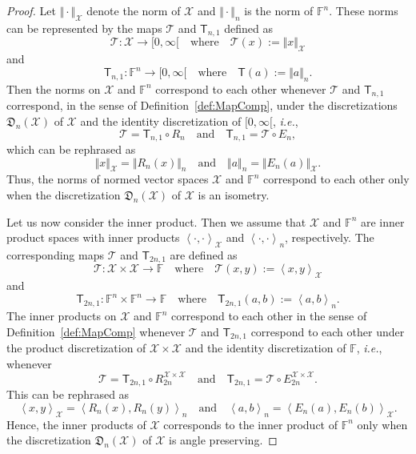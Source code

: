 \documentclass[a4paper]{paper}
\newcommand{\discr}{\mathfrak{D}}
\newcommand{\VecSpace}[1]{\mathscr{#1}}
\newcommand{\Field}{\mathbb{F}}
\newcommand{\Op}[1]{\mathcal{#1}}
\newcommand{\DiscOp}[1]{\mathsf{#1}}
\newcommand{\ip}[2]{\left \langle #1,#2 \right\rangle}
\newcommand{\ie}{\textsl{i.e.}\xspace}
\begin{document}
\begin{proof}
Let $\Vert \cdot \Vert_{\VecSpace{X}}$ denote the norm of $\VecSpace{X}$ and $\Vert \cdot \Vert_{n}$ is the 
norm of $\Field^{n}$. These norms can be represented by the maps $\Op{T}$ and $\DiscOp{T}_{n,1}$ 
defined as  
\[ \Op{T} \colon \VecSpace{X}  \to [0,\infty[  \quad\text{where}\quad \Op{T}(x):=\Vert x \Vert_{\VecSpace{X}} \] 
and 
\[ \DiscOp{T}_{n,1} \colon \Field^{n} \to [0,\infty[  \quad\text{where}\quad \DiscOp{T}(a):=\Vert a \Vert_{n}. \] 
Then the norms on $\VecSpace{X}$ and $\Field^{n}$ 
correspond to each other whenever $\Op{T}$ and $\DiscOp{T}_{n,1}$ correspond,
in the sense of Definition~\ref{def:MapComp},  under the discretizations $\discr_{n}(\VecSpace{X})$ of $\VecSpace{X}$ 
and the identity discretization of  $[0,\infty[$, \ie,
\[  \Op{T} =  \DiscOp{T}_{n,1} \circ R_{n}
   \quad\text{and}\quad 
   \DiscOp{T}_{n,1} =  \Op{T} \circ E_{n},
\]
which can be rephrased as
\[ \Vert x \Vert_{\VecSpace{X}} = \bigl\Vert R_{n}(x) \bigr\Vert_{n}
    \quad \text{and}\quad
   \Vert a \Vert_{n} = \bigl\Vert E_{n}(a) \bigr\Vert_{\VecSpace{X}}.
\]
Thus, the norms of normed vector spaces $\VecSpace{X}$ and $\Field^{n}$ correspond
to each other only when the discretization $\discr_{n}(\VecSpace{X})$ of $\VecSpace{X}$ is an isometry. 

Let us now consider the inner product. Then we assume that $\VecSpace{X}$ and $\Field^{n}$ are inner 
product spaces with inner products $\ip{\cdot}{\cdot}_\VecSpace{X}$ and $\ip{\cdot}{\cdot}_{n}$, 
respectively. The corresponding maps $\Op{T}$ and $\DiscOp{T}_{2n,1}$ are 
defined as  
\[ \Op{T} \colon \VecSpace{X} \times \VecSpace{X}  \to \Field  \quad\text{where}\quad \Op{T}(x,y):=\ip{x}{y}_{\VecSpace{X}} \] 
and 
\[ \DiscOp{T}_{2n,1} \colon \Field^{n} \times \Field^{n}  \to \Field  \quad\text{where}\quad \DiscOp{T}_{2n,1}(a,b):=\ip{a}{b}_{n}. \] 
The inner products on $\VecSpace{X}$ and $\Field^{n}$ 
correspond to each other in the sense of Definition~\ref{def:MapComp} 
whenever $\Op{T}$ and $\DiscOp{T}_{2n,1}$ correspond to each other 
under the product discretization of $\VecSpace{X}\times \VecSpace{X}$ and the identity discretization of 
$\Field$, \ie, whenever 
\[ \Op{T} =  \DiscOp{T}_{2n,1} \circ R_{2n}^{\VecSpace{X}\times \VecSpace{X}} 
   \quad\text{and}\quad 
   \DiscOp{T}_{2n,1} =  \Op{T} \circ E_{2n}^{\VecSpace{X}\times \VecSpace{X}}.
\]
This can be rephrased as
\[ \ip{x}{y}_{\VecSpace{X}} =  \ip{R_{n}(x)}{R_{n}(y)}_{n}
    \quad\text{and}\quad 
   \ip{a}{b}_{n} = \ip{E_{n}(a)}{E_{n}(b)}_{\VecSpace{X}}.
\]
Hence, the inner products of $\VecSpace{X}$ corresponds to the inner product of $\Field^{n}$ 
only when the discretization $\discr_{n}(\VecSpace{X})$ of $\VecSpace{X}$ is angle preserving.
\end{proof}
\end{document}
